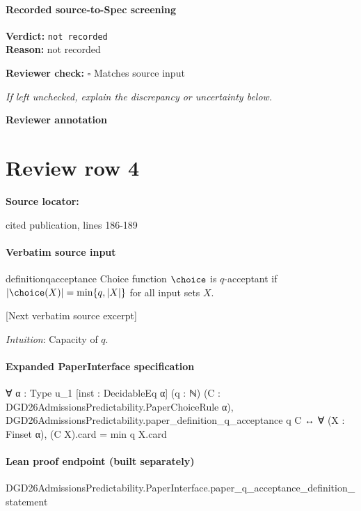 \documentclass[10pt]{article}
\newcommand{\reviewerbox}{%
  \par\noindent\fbox{\parbox{0.96\linewidth}{\rule{0pt}{0.38in}}}\par
}
\newcommand{\reviewmatch}[1]{%
  \par\noindent\textbf{Reviewer check:} $\square$\; #1\par
  \noindent\emph{If left unchecked, explain the discrepancy or uncertainty below.}\par
}
\begin{document}
\paragraph{Recorded source-to-Spec screening}
\textbf{Verdict:} \texttt{not recorded}
\\
\textbf{Reason:} not recorded
\reviewmatch{Matches source input}
\noindent\textbf{Reviewer annotation}\par
\reviewerbox
\clearpage
\hypertarget{source-claim-51b92e4a229b02a5}{}
\section*{Review row 4}
\textbf{Source locator:} {\footnotesize\raggedright cited publication, lines 186-\allowbreak{}189\par}
\paragraph{Verbatim source input}
\begin{ReviewVerbatim}
\begin{restatable}[$q$-Acceptance]{definition}{qacceptance}
\label{def:q-acceptance}
Choice function $\choice$ is $q$-acceptant if $|\choice(X)| = \min\{q, |X|\}$ for all input sets $X$.
\end{restatable}

[Next verbatim source excerpt]

\qacceptance*
\textit{Intuition}: Capacity of $q$.

\substitutability*
\end{ReviewVerbatim}


\paragraph{Expanded PaperInterface specification}
\begin{ReviewVerbatim}
∀ {α : Type u_1} [inst : DecidableEq α] (q : ℕ) (C : DGD26AdmissionsPredictability.PaperChoiceRule α),
  DGD26AdmissionsPredictability.paper_definition_q_acceptance q C ↔ ∀ (X : Finset α), (C X).card = min q X.card
\end{ReviewVerbatim}

\paragraph{Lean proof endpoint (built separately)}\begin{ReviewVerbatim}
DGD26AdmissionsPredictability.PaperInterface.paper_q_acceptance_definition_statement
\end{ReviewVerbatim}
\end{document}
